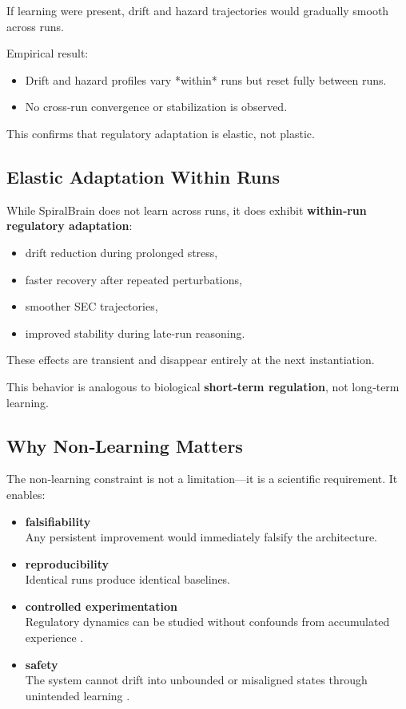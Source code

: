 \documentclass[12pt,a4paper]{report}
\begin{document}
If learning were present, drift and hazard trajectories would gradually smooth across runs.

Empirical result:  
\begin{itemize}
\item Drift and hazard profiles vary *within* runs but reset fully between runs.  
\item No cross‑run convergence or stabilization is observed.
\end{itemize}

This confirms that regulatory adaptation is elastic, not plastic.

\subsection{Elastic Adaptation Within Runs}

While SpiralBrain does not learn across runs, it does exhibit \textbf{within‑run regulatory adaptation}:

\begin{itemize}
\item drift reduction during prolonged stress,  
\item faster recovery after repeated perturbations,  
\item smoother SEC trajectories,  
\item improved stability during late‑run reasoning.
\end{itemize}

These effects are transient and disappear entirely at the next instantiation.

This behavior is analogous to biological \textbf{short‑term regulation}, not long‑term learning.

\subsection{Why Non‑Learning Matters}

The non‑learning constraint is not a limitation—it is a scientific requirement. It enables:

\begin{itemize}
\item \textbf{falsifiability} \\
  Any persistent improvement would immediately falsify the architecture.

\item \textbf{reproducibility} \\
  Identical runs produce identical baselines.

\item \textbf{controlled experimentation} \\
  Regulatory dynamics can be studied without confounds from accumulated experience \cite{SpiralBrainV3}.

\item \textbf{safety} \\
  The system cannot drift into unbounded or misaligned states through unintended learning \cite{SpiralBrainV3}.
\end{itemize}
\end{document}
